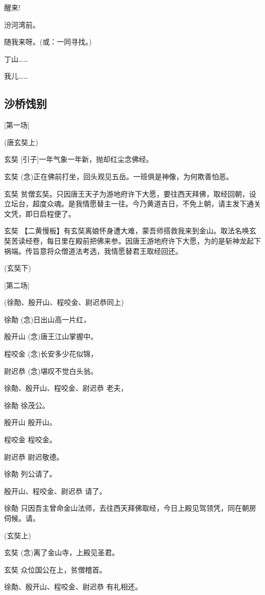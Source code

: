醒来!

汾河湾前。

随我来呀。(或：一同寻找。)

丁山\ldots{}\ldots{}

我儿\ldots{}\ldots{}

\newpage
\hypertarget{ux6c99ux6865ux996fux522b}{%
\subsection{沙桥饯别}\label{ux6c99ux6865ux996fux522b}}

{[}第一场{]}

(唐玄奘上)

玄奘 {[}引子{]}一年气象一年新，抛却红尘念佛经。

玄奘 (念)正在佛前打坐，回头观见五岳。一班俱是神像，为何欺善怕恶。

玄奘
贫僧玄奘。只因唐王天子为游地府许下大愿，要往西天拜佛，取经回朝，设立坛台，超度众魂。是我情愿替主一往。今乃黄道吉日，不免上朝，请主发下通关文凭，即日启程便了。

玄奘
【二黄慢板】有玄奘离娘怀身遭大难，蒙吾师搭救我来到金山。取法名唤玄奘苦读经卷，每日里在殿前把佛来参。因唐王游地府许下大愿，为的是斩神龙起下祸端。传旨意将众僧道法考选，我情愿替君王取经回还。

(玄奘下)

{[}第二场{]}

(徐勣、殷开山、程咬金、尉迟恭同上)

徐勣 (念)日出山高一片红，

殷开山 (念)唐王江山掌握中。

程咬金 (念)长安多少花似锦，

尉迟恭 (念)堪叹不觉白头翁。

徐勣、殷开山、程咬金、尉迟恭 老夫，

徐勣 徐茂公。

殷开山 殷开山。

程咬金 程咬金。

尉迟恭 尉迟敬德。

徐勣 列公请了。

殷开山、程咬金、尉迟恭 请了。

徐勣
只因吾主曾命金山法师，去往西天拜佛取经，今日上殿见驾领凭，同在朝房伺候。请。

(玄奘上)

玄奘 (念)离了金山寺，上殿见圣君。

玄奘 众位国公在上，贫僧稽首。

徐勣、殷开山、程咬金、尉迟恭 有礼相还。

